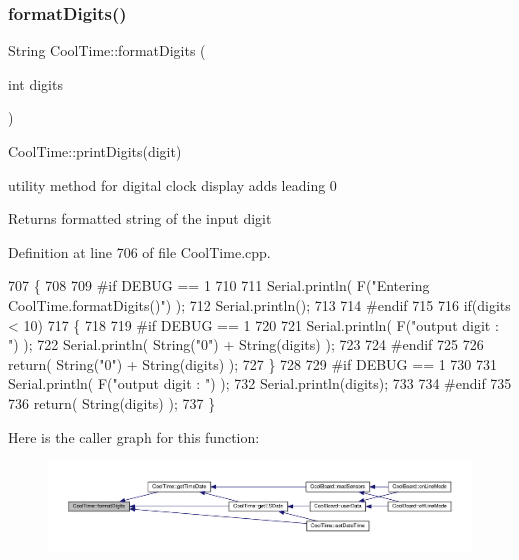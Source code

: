 \subsubsection{\texorpdfstring{format\+Digits()}{formatDigits()}}
{\footnotesize\ttfamily String Cool\+Time\+::format\+Digits (\begin{DoxyParamCaption}\item[{int}]{digits }\end{DoxyParamCaption})}

Cool\+Time\+::print\+Digits(digit)

utility method for digital clock display adds leading 0

\begin{DoxyReturn}{Returns}
formatted string of the input digit 
\end{DoxyReturn}


Definition at line 706 of file Cool\+Time.\+cpp.


\begin{DoxyCode}
707 \{
708 
709 \textcolor{preprocessor}{#if DEBUG == 1 }
710 
711     Serial.println( F(\textcolor{stringliteral}{"Entering CoolTime.formatDigits()"}) );
712     Serial.println();
713 
714 \textcolor{preprocessor}{#endif }
715 
716     \textcolor{keywordflow}{if}(digits < 10)
717     \{
718     
719 \textcolor{preprocessor}{    #if DEBUG == 1}
720 
721         Serial.println( F(\textcolor{stringliteral}{"output digit : "}) );
722         Serial.println( String(\textcolor{stringliteral}{"0"}) + String(digits) );
723 
724 \textcolor{preprocessor}{    #endif}
725 
726         \textcolor{keywordflow}{return}( String(\textcolor{stringliteral}{"0"}) + String(digits) );
727     \}
728     
729 \textcolor{preprocessor}{#if DEBUG == 1 }
730 
731     Serial.println( F(\textcolor{stringliteral}{"output digit : "}) );
732     Serial.println(digits);
733 
734 \textcolor{preprocessor}{#endif}
735 
736     \textcolor{keywordflow}{return}( String(digits) );
737 \}
\end{DoxyCode}
Here is the caller graph for this function\+:\nopagebreak
\begin{figure}[H]
\begin{center}
\leavevmode
\includegraphics[width=350pt]{d6/d49/class_cool_time_acd537cd4210d7bde4e1f5c47d2ac0456_icgraph}
\end{center}
\end{figure}
\mbox{\label{class_cool_time_ac4f32ee513c1328d984306645e8785a4}} 
